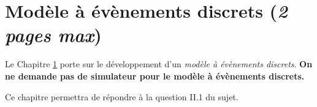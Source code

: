 \chapter{Modèle à évènements discrets (\textit{2 pages max})}
\label{chapitre:etat_discret}

Le Chapitre \ref{chapitre:etat_discret} porte sur le développement d’un \textit{modèle à évènements discrets}. \textbf{On ne demande pas de simulateur pour le modèle à évènements discrets.}

Ce chapitre permettra de répondre à la question II.1 du sujet.
